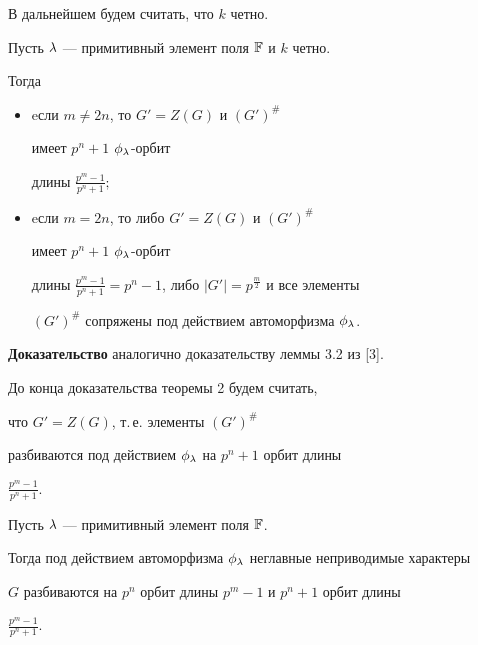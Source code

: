 В дальнейшем будем считать, что $k$ четно.








\begin{lem}


Пусть $\lambda$ --- примитивный элемент поля $\Bbb F$ и $k$ четно. 


Тогда


\begin{itemize}


\item[(i)] eсли $m\neq2n$, то $G'=Z(G)$ и $(G')^{\#}$


имеет $p^n+1$ $\phi_\lambda$-орбит


длины $\frac{p^m-1}{p^n+1};$


\item[(ii)] eсли $m=2n$, то либо $G'=Z(G)$ и $(G')^{\#}$


имеет $p^n+1$ $\phi_\lambda$-орбит


длины $\frac{p^m-1}{p^n+1}=p^n-1$, либо $|G'|=p^{\frac m2}$ и все элементы


$(G')^{\#}$ сопряжены под действием автоморфизма $\phi_\lambda$.


\end{itemize}


\end{lem}








{\bf Доказательство} аналогично доказательству леммы 3.2 из [3].








До конца доказательства теоремы 2 будем считать,


что $G'=Z(G)$, т.\,е. элементы $(G')^{\#}$


разбиваются под действием $\phi_\lambda$ на $p^n+1$ орбит длины


$\frac{p^m-1}{p^n+1}$.








\begin{lem}


Пусть $\lambda$ --- примитивный элемент поля $\Bbb F$. 


Тогда под действием автоморфизма $\phi_\lambda$ неглавные неприводимые характеры


$G$ разбиваются на $p^n$ орбит длины $p^m-1$ и $p^n+1$ орбит длины


$\frac{p^m-1}{p^n+1}$.


\end{lem}








